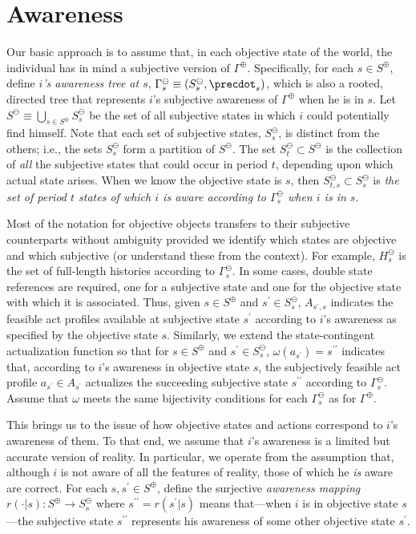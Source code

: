 \documentclass[
11pt,
titlepage,
reqno,
]{article}%
\theoremstyle{definition}
\begin{document}
\section{Awareness}
Our basic approach is to assume that, in each objective state of the world, the individual has in mind a subjective version of $\Gamma^\oplus$. 
Specifically, for each $s\in S^\oplus$, define \textit{$i$'s awareness tree at $s$}, $\Gamma^\ominus_s\equiv(S^\ominus_s,\precdot_s)$, which is also a rooted, directed tree that represents $i$'s subjective awareness of $\Gamma^\oplus$ when he is in $s$.
Let $S^\ominus\equiv \bigcup_{s\in S^\oplus}S^\ominus_s$ be the set of all subjective states in which $i$ could potentially find himself.
Note that each set of subjective states, $S^\ominus_s$,  is distinct from the others; i.e., the sets $S^\ominus_s$ form a partition of $S^\ominus$.
The set $S^\ominus_t\subset S^\ominus$ is the collection of \textit{all} the subjective states that could occur in period $t$, depending upon which actual state arises.
When we know the objective state is $s$, then $S^\ominus_{t,s}\subset S^\ominus_s$ is \textit{the set of period $t$ states of which $i$ is aware according to $\Gamma^\ominus_s$ when $i$ is in $s$}.

Most of the notation for objective objects transfers to their subjective counterparts without ambiguity provided we identify which states are objective and which subjective (or understand these from the context).
For example, $H^\ominus_s$ is the set of full-length histories according to $\Gamma^\ominus_s$.
In some cases, double state references are required, one for a subjective state and one for the objective state with which it is associated.
Thus, given $s\in S^\oplus$ and $s^\prime\in S^\ominus_s$, $A_{s^\prime,s}$ indicates the feasible act profiles available at subjective state $s^\prime$ according to $i$'s awareness as specified by the objective state $s$.
Similarly, we extend the state-contingent actualization function so that for $s\in S^\oplus$ and $s^\prime\in S^\ominus_s$, $\omega(a_{s^\prime})=s^{\prime\prime}$ indicates that, according to $i$'s awareness  in objective state $s$, the subjectively feasible act profile $a_{s^\prime}\in A_{s^\prime}$ actualizes the succeeding subjective state $s^{\prime\prime}$ according to $\Gamma^\ominus_s$.
Assume that $\omega$ meets the same bijectivity conditions for each $\Gamma^\ominus_s$ as for $\Gamma^\oplus$.
	
This brings us to the issue of how objective states and actions correspond to $i$'s awareness of them.
To that end, we assume that $i$'s awareness is a limited but accurate version of reality.
In particular, we  operate from the assumption that, although $i$ is not aware of all the features of reality,  those of which he \textit{is} aware are correct.  	
For each $s,s^\prime\in S^\oplus$, define the surjective \textit{awareness mapping} $r(\cdot|s):S^\oplus\rightarrow S^\ominus_s$ where $s^{\prime\prime}=r(s^\prime|s)$ means that---when $i$ is in objective state $s$---the subjective state $s^{\prime\prime}$  represents his awareness of some other objective state $s^\prime$.
\end{document}
